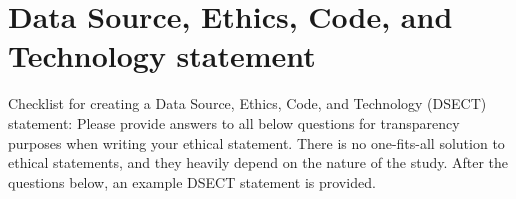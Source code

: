 \documentclass[11pt, a4paper]{article}
\begin{document}


\begin{abstract}
This is where the abstract goes. Don't forget to change the variables in \texttt{main.tex} to change all general placeholders shown in this document. The \texttt{frontmatter.tex} file should be left alone. The abstract should summarize in 150-250 words the contents of the thesis, mentioning: 1) the research goal, 2) the methods employed, 3) data collected or dataset/s used, 4) the main findings.
\end{abstract}

\section{Data Source, Ethics, Code, and Technology statement}
Checklist for creating a Data Source, Ethics, Code, and Technology (DSECT) statement:
Please provide answers to all below questions for transparency purposes when writing your ethical statement. There is no one-fits-all solution to ethical statements, and they heavily
depend on the nature of the study. After the questions below, an example DSECT statement is provided. 
\end{document}
